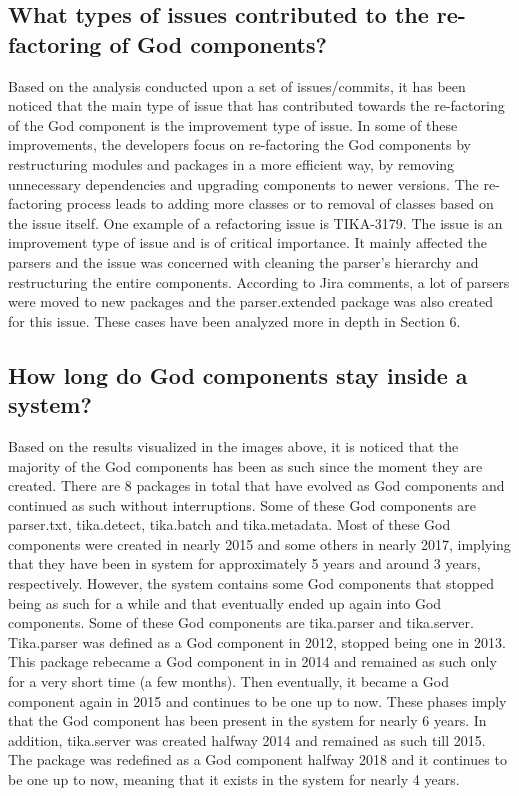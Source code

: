 \documentclass{article}
\begin{document}
\subsection{What types of issues contributed to the re-factoring of God components?}
Based on the analysis conducted upon a set of issues/commits, it has been noticed that the main type of issue that has contributed towards the re-factoring of the God component is the improvement type of issue. In some of these improvements, the developers focus on re-factoring the God components by restructuring modules and packages in a more efficient way, by removing unnecessary dependencies and upgrading components to newer versions. The re-factoring process leads to adding more classes or to removal of classes based on the issue itself. One example of a refactoring issue is TIKA-3179. The issue is an improvement type of issue and is of critical importance. It mainly affected the parsers and the issue was concerned with cleaning the parser’s hierarchy and restructuring the entire components. According to Jira comments, a lot of parsers were moved to new packages and the parser.extended package was also created for this issue. These cases have been analyzed more in depth in Section 6. 
\subsection{How long do God components stay inside a system?}
Based on the results visualized in the images above, it is noticed that the majority of the God components has been as such since the moment they are created. There are 8 packages in total that have evolved as God components and continued as such without interruptions. Some of these God components are parser.txt, tika.detect, tika.batch and tika.metadata. Most of these God components were created in nearly 2015 and some others in nearly 2017, implying that they have been in system for approximately 5 years and around 3 years, respectively. However, the system contains some God components that stopped being as such for a while and that eventually ended up again into God components. Some of these God components are tika.parser and tika.server. Tika.parser was defined as a God component in 2012, stopped being one in 2013. This package rebecame a God component in in 2014 and remained as such only for a very short time (a few months). Then eventually, it became a God component again in 2015 and continues to be one up to now. These phases imply that the God component has been present in the system for nearly 6 years. In addition, tika.server was created halfway 2014 and remained as such till 2015. The package was redefined as a God component halfway 2018 and it continues to be one up to now, meaning that it exists in the system for nearly 4 years.\\
\end{document}
